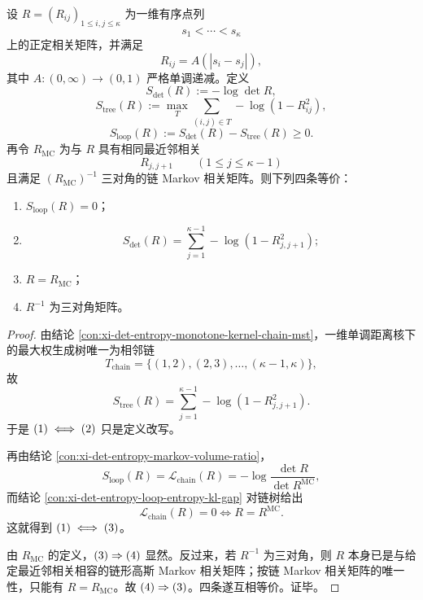 \begin{theorem}\label{thm:conclusion-chain-markov-rigidity-fourfold-equivalence}
设 \(R=(R_{ij})_{1\le i,j\le \kappa}\) 为一维有序点列
\[
s_1<\cdots<s_\kappa
\]
上的正定相关矩阵，并满足
\[
R_{ij}=A(|s_i-s_j|),
\]
其中 \(A:(0,\infty)\to(0,1)\) 严格单调递减。定义
\[
S_{\det}(R):=-\log\det R,
\]
\[
S_{\mathrm{tree}}(R):=\max_T\sum_{(i,j)\in T}-\log(1-R_{ij}^2),
\]
\[
S_{\mathrm{loop}}(R):=S_{\det}(R)-S_{\mathrm{tree}}(R)\ge 0.
\]
再令 \(R_{\mathrm{MC}}\) 为与 \(R\) 具有相同最近邻相关
\[
R_{j,j+1}\qquad (1\le j\le \kappa-1)
\]
且满足 \((R_{\mathrm{MC}})^{-1}\) 三对角的链 Markov 相关矩阵。则下列四条等价：
\begin{enumerate}
  \item \(S_{\mathrm{loop}}(R)=0\)；
  \item
  \[
  S_{\det}(R)=\sum_{j=1}^{\kappa-1}-\log(1-R_{j,j+1}^2);
  \]
  \item \(R=R_{\mathrm{MC}}\)；
  \item \(R^{-1}\) 为三对角矩阵。
\end{enumerate}
\end{theorem}
\begin{proof}
由结论 \ref{con:xi-det-entropy-monotone-kernel-chain-mst}，一维单调距离核下的最大权生成树唯一为相邻链
\[
T_{\mathrm{chain}}=\{(1,2),(2,3),\dots,(\kappa-1,\kappa)\},
\]
故
\[
S_{\mathrm{tree}}(R)=\sum_{j=1}^{\kappa-1}-\log(1-R_{j,j+1}^2).
\]
于是 \(\textup{(1)}\iff\textup{(2)}\) 只是定义改写。

再由结论 \ref{con:xi-det-entropy-markov-volume-ratio}，
\[
S_{\mathrm{loop}}(R)=\mathcal L_{\mathrm{chain}}(R)
=-\log\frac{\det R}{\det R^{\mathrm{MC}}},
\]
而结论 \ref{con:xi-det-entropy-loop-entropy-kl-gap} 对链树给出
\[
\mathcal L_{\mathrm{chain}}(R)=0
\iff
R=R^{\mathrm{MC}}.
\]
这就得到 \(\textup{(1)}\iff\textup{(3)}\)。

由 \(R_{\mathrm{MC}}\) 的定义，\(\textup{(3)}\Rightarrow\textup{(4)}\) 显然。反过来，若 \(R^{-1}\) 为三对角，则 \(R\) 本身已是与给定最近邻相关相容的链形高斯 Markov 相关矩阵；按链 Markov 相关矩阵的唯一性，只能有 \(R=R_{\mathrm{MC}}\)。故 \(\textup{(4)}\Rightarrow\textup{(3)}\)。四条遂互相等价。证毕。
\end{proof}

